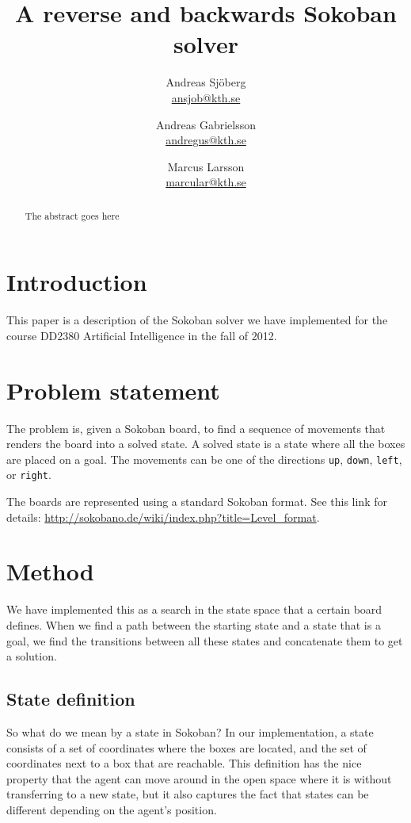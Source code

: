 \documentclass[a4paper,11pt]{article}
\title{A reverse and backwards Sokoban solver \\ }
\author{Andreas Sjöberg \\ \url{ansjob@kth.se} 
		\and Andreas Gabrielsson \\ \url{andregus@kth.se} 
		\and Marcus Larsson \\ \url{marcular@kth.se}
	}
\begin{document}
\thispagestyle{plain}
\maketitle

\begin{abstract}
The abstract goes here
\end{abstract}

\clearpage

\tableofcontents

\clearpage

\section{Introduction}
This paper is a description of the Sokoban solver we have implemented for the course
DD2380 Artificial Intelligence in the fall of 2012.

\section{Problem statement}

The problem is, given a Sokoban board, to find a sequence of movements that renders the
board into a solved state.
A solved state is a state where all the boxes are placed on a goal.
The movements can be one of the directions \verb!up!, \verb!down!, \verb!left!, or \verb!right!.

The boards are represented using a standard Sokoban format. See this link for details:
\url{http://sokobano.de/wiki/index.php?title=Level_format}.


\section{Method}

We have implemented this as a search in the state space that a certain board defines.
When we find a path between the starting state and a state that is a goal,
we find the transitions between all these states and concatenate them to get a solution.

\subsection{State definition}

So what do we mean by a state in Sokoban?
In our implementation, a state consists of a set of coordinates where the boxes are located,
and the set of coordinates next to a box that are reachable.
This definition has the nice property that the agent can move around in the
open space where it is without transferring to a new state,
but it also captures the fact that states can be different depending on the agent's position.
\end{document}
